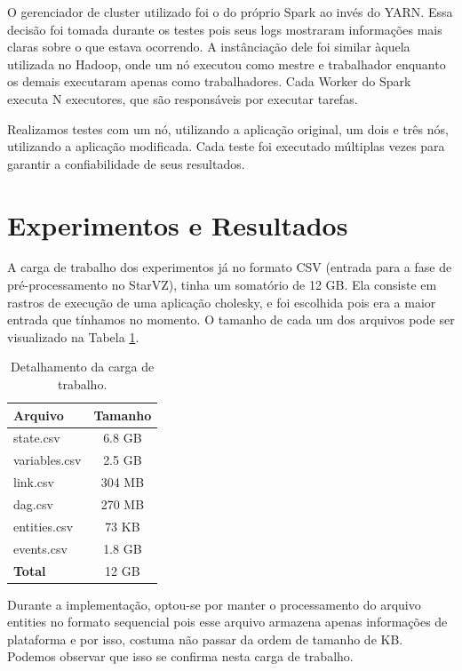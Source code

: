 O gerenciador de cluster utilizado foi o do próprio Spark ao invés do YARN. 
Essa decisão foi tomada durante os testes pois seus logs mostraram 
informações mais claras sobre o que estava ocorrendo. A instânciação dele foi 
similar àquela utilizada no Hadoop, onde um nó executou como mestre e 
trabalhador enquanto os demais executaram apenas como trabalhadores. Cada 
Worker do Spark executa N executores, que são responsáveis por executar tarefas.

Realizamos testes com um nó, utilizando a aplicação original, um dois e três 
nós, utilizando a aplicação modificada. Cada teste foi executado múltiplas 
vezes para garantir a confiabilidade de seus resultados. 


\section{Experimentos e Resultados} \label{sect:results}

A carga de trabalho dos experimentos já no formato CSV (entrada para a fase de 
pré-processamento no StarVZ), tinha um somatório de 12 GB. Ela consiste em 
rastros de execução de uma aplicação cholesky, e foi escolhida pois era a maior
entrada que tínhamos no momento. O tamanho de cada um dos arquivos pode ser 
visualizado na Tabela \ref{tab:input_sz}.

\begin{table}[H]
\centering
\begin{tabular}{l c} \toprule
\textbf{Arquivo}  &  \textbf{Tamanho} \\ 
\midrule
state.csv	& 6.8 GB \\
variables.csv  	& 2.5 GB \\
link.csv       	& 304 MB \\
dag.csv        	& 270 MB \\
entities.csv	& 73 KB \\
events.csv	& 1.8 GB \\
\textbf{Total}  & 12 GB  \\
\end{tabular}
\caption{Detalhamento da carga de trabalho.}
\label{tab:input_sz}
\end{table}

Durante a implementação, optou-se por manter o processamento do arquivo entities 
no formato sequencial pois esse arquivo armazena apenas informações de 
plataforma e por isso, costuma não passar da ordem de tamanho de KB. Podemos 
observar que isso se confirma nesta carga de trabalho.

